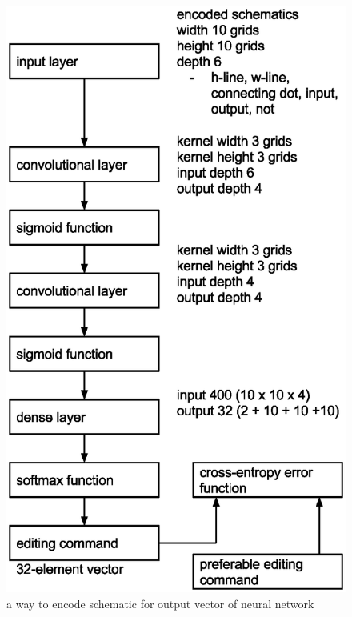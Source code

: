 \documentclass[twocolumn]{article}
\begin{document}
\begin{figure}[tb]
 \begin{center}
  \begin{minipage}{\hsize}
   \includegraphics[width=\hsize]{layers.eps}
   \caption{a way to encode schematic for output vector of neural network}
   \label{fig:layers}
  \end{minipage}
 \end{center}
\end{figure}
\end{document}
